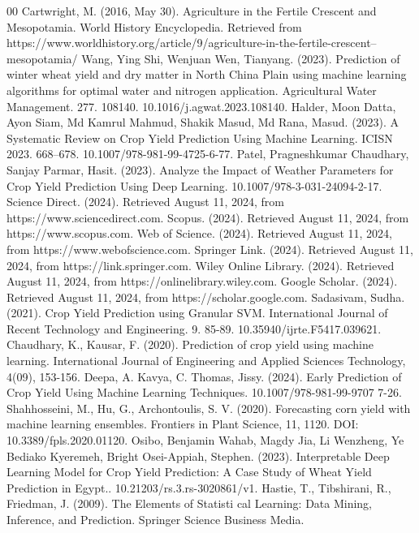 \documentclass[conference]{IEEEtran}
\begin{document}
\begin{thebibliography}{00}
 Cartwright, M. (2016, May 30). Agriculture in the Fertile Crescent and Mesopotamia. World History Encyclopedia. Retrieved from https://www.worldhistory.org/article/9/agriculture-in-the-fertile-crescent--mesopotamia/
 Wang, Ying Shi, Wenjuan Wen, Tianyang. (2023). Prediction of winter wheat yield and dry matter in North China Plain using machine learning algorithms for optimal water and nitrogen application. Agricultural Water Management. 277. 108140. 10.1016/j.agwat.2023.108140. 
 Halder, Moon Datta, Ayon Siam, Md Kamrul Mahmud, Shakik Masud, Md Rana, Masud. (2023). A Systematic Review on Crop Yield Prediction Using Machine Learning. ICISN 2023. 668–678. 10.1007/978-981-99-4725-6-77. 
 Patel, Pragneshkumar Chaudhary, Sanjay Parmar, Hasit. (2023). Analyze the Impact of Weather Parameters for Crop Yield Prediction Using Deep Learning. 10.1007/978-3-031-24094-2-17.
 Science Direct. (2024). Retrieved August 11, 2024, from https://www.sciencedirect.com.
 Scopus. (2024). Retrieved August 11, 2024, from https://www.scopus.com.
 Web of Science. (2024). Retrieved August 11, 2024, from https://www.webofscience.com.
 Springer Link. (2024). Retrieved August 11, 2024, from https://link.springer.com.
 Wiley Online Library. (2024). Retrieved August 11, 2024, from https://onlinelibrary.wiley.com.
 Google Scholar. (2024). Retrieved August 11, 2024, from https://scholar.google.com.
 Sadasivam, Sudha. (2021). Crop Yield Prediction using Granular SVM. International Journal of Recent Technology and Engineering. 9. 85-89. 10.35940/ijrte.F5417.039621. 
 Chaudhary, K., Kausar, F. (2020). Prediction of crop yield using machine learning. International Journal of Engineering and Applied Sciences Technology, 4(09), 153-156. 
 Deepa, A. Kavya, C. Thomas, Jissy. (2024). Early Prediction of Crop Yield Using Machine Learning Techniques. 10.1007/978-981-99-9707 7-26. 
 Shahhosseini, M., Hu, G., Archontoulis, S. V. (2020). Forecasting corn yield with machine learning ensembles. Frontiers in Plant Science, 11, 1120. DOI: 10.3389/fpls.2020.01120. 
 Osibo, Benjamin Wahab, Magdy Jia, Li Wenzheng, Ye Bediako Kyeremeh, Bright Osei-Appiah, Stephen. (2023). Interpretable Deep Learning Model for Crop Yield Prediction: A Case Study of Wheat Yield Prediction in Egypt.. 10.21203/rs.3.rs-3020861/v1. 
 Hastie, T., Tibshirani, R., Friedman, J. (2009). The Elements of Statisti cal Learning: Data Mining, Inference, and Prediction. Springer Science Business Media. 

\end{thebibliography}
\end{document}
